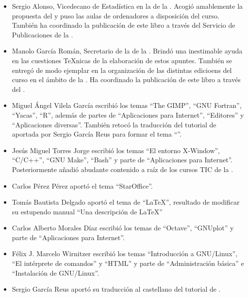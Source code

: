 \begin{itemize}

\item {\sc Sergio Alonso}, Vicedecano de Estadística en la \FMAT de la
\ULL.  Acogió amablemente  la propuesta  del  \CILA y  puso las  aulas
de  ordenadores a  disposición  del curso.  También  ha coordinado  la
publicación de este libro a través del Servicio de Publicaciones de la
\ULL.

\item {\sc  Manolo García Román}, Secretario  de la \FMAT de  la \ULL.
Brindó  una inestimable  ayuda  en las  cuestiones  {\TeX}nicas de  la
elaboración de estos  apuntes. También se entregó de  modo ejemplar en
la organización de  las distintas edicioens del curso en  el ámbito de
la  \ULL. Ha  coordinado la  publicación de  este libro  a través  del
\SPULL.

\item  {\sc  Miguel Ángel  Vilela  García}  escribió los  temas  ``The
GIMP'',  ``GNU  Fortran'',  ``Yacas'',  ``R'',  además  de  partes  de
``Aplicaciones   para   Internet'',  ``Editores''   y   ``Aplicaciones
diversas''.  También  retocó  la  traducción del  tutorial  de  \LyX{}
aportada por {\sc Sergio García Reus} para formar el tema ``\LyX''.

\item  {\sc  Jesús  Miguel  Torres  Jorge}  escribió  los  temas  ``El
entorno  X-Window'',   ``C/C++'',  ``GNU  Make'',  ``Bash''   y  parte
de  ``Aplicaciones  para  Internet''. Posteriormente  añadió  abudante
contenido a raíz de los cursos TIC de la \ULL.

\item {\sc Carlos Pérez Pérez} aportó el tema ``StarOffice''.

\item  {\sc Tomás  Bautista  Delgado} aportó  el  tema de  ``\LaTeX'',
resultado  de  modificar  su  estupendo manual  ``Una  descripción  de
\LaTeX''

\item  {\sc  Carlos  Alberto  Morales  Díaz}  escribió  los  temas  de
``Octave'', ``GNUplot'' y parte de ``Aplicaciones para Internet''.

\item   {\sc  Félix   J.   Marcelo  Wirnitzer}   escribió  los   temas
``Introducción a GNU/Linux'', ``El intérprete de comandos'' y ``HTML''
y parte de ``Administración básica'' e ``Instalación de GNU/Linux''.

\item {\sc Sergio García Reus}  aportó su traducción al castellano del
tutorial de \LyX.


\end{itemize}
